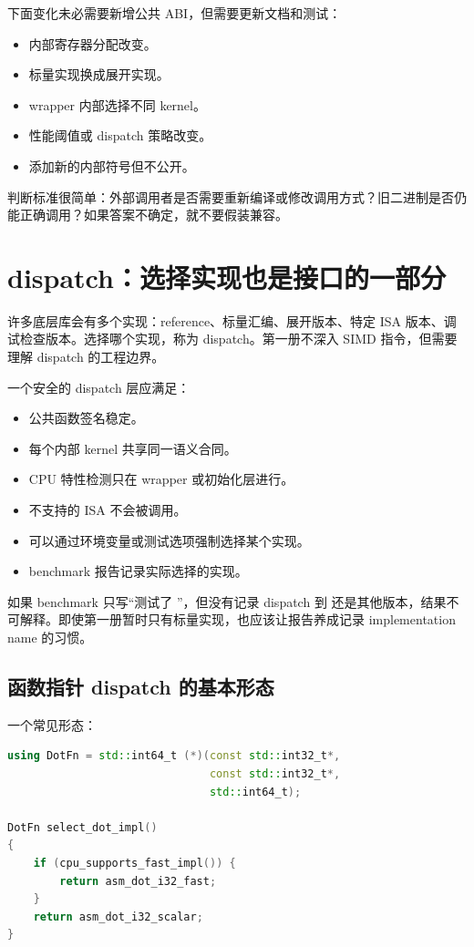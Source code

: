下面变化未必需要新增公共 ABI，但需要更新文档和测试：

\begin{itemize}
  \item 内部寄存器分配改变。
  \item 标量实现换成展开实现。
  \item wrapper 内部选择不同 kernel。
  \item 性能阈值或 dispatch 策略改变。
  \item 添加新的内部符号但不公开。
\end{itemize}

判断标准很简单：外部调用者是否需要重新编译或修改调用方式？旧二进制是否仍能正确调用？如果答案不确定，就不要假装兼容。

\section{dispatch：选择实现也是接口的一部分}

许多底层库会有多个实现：reference、标量汇编、展开版本、特定 ISA 版本、调试检查版本。选择哪个实现，称为 dispatch。第一册不深入 SIMD 指令，但需要理解 dispatch 的工程边界。

一个安全的 dispatch 层应满足：

\begin{itemize}
  \item 公共函数签名稳定。
  \item 每个内部 kernel 共享同一语义合同。
  \item CPU 特性检测只在 wrapper 或初始化层进行。
  \item 不支持的 ISA 不会被调用。
  \item 可以通过环境变量或测试选项强制选择某个实现。
  \item benchmark 报告记录实际选择的实现。
\end{itemize}

如果 benchmark 只写“测试了 ”，但没有记录 dispatch 到  还是其他版本，结果不可解释。即使第一册暂时只有标量实现，也应该让报告养成记录 implementation name 的习惯。

\subsection{函数指针 dispatch 的基本形态}

一个常见形态：

\begin{lstlisting}[language=C++]
using DotFn = std::int64_t (*)(const std::int32_t*,
                               const std::int32_t*,
                               std::int64_t);

DotFn select_dot_impl()
{
    if (cpu_supports_fast_impl()) {
        return asm_dot_i32_fast;
    }
    return asm_dot_i32_scalar;
}
\end{lstlisting}

